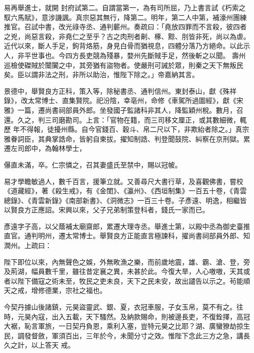 \begin{pinyinscope}
 易再舉進士，就開
 封府試第二。自謂當第一，為有司所屈，乃上書言試《朽索之馭六馬賦》，意涉譏諷。真宗惡其無行，降第二。明年，第二人中第，補濠州團練推官。召試中書，改光祿寺丞、通判蘄州。奏疏曰：「堯放四罪而不言殺，彼四者之兇，尚惡言殺，非堯仁之至乎？古之肉刑者劓、椓、黥、刖皆非死，尚以為虐。近代以來，斷人手足，鉤背烙筋，身見白骨而猶視息，四體分落乃方絕命。以此示人，非平世事也。今四方長吏競為殘暴，婺州先斷賊手足，然後斬之以聞。
 壽州巡檢使磔賊於闤闠之中，其旁猶有盜物者。使嚴刑可誡於眾，則秦之天下無叛民矣。臣以謂非法之刑，非所以助治，惟陛下除之。」帝嘉納其言。



 景德中，舉賢良方正科，策入等，除秘書丞、通判信州。東封泰山，獻《殊祥錄》，改太常博士、直集賢院。祀汾陰，幸亳州，命修《車駕所過圖經》，獻《宋雅》一篇，遷尚書祠部員外郎。坐發國子監諸科非其人，降監穎州稅。數月，召還。久之，判三司磨勘司。上言：「官物在籍，而三司移文厘正，或其數細微，輒歷
 年不得報，徒擾州縣。自今官錢百、穀斗、帛二尺以下，非欺紿者除之。」真宗雅眷詞臣，其典掌誥命，皆躬自柬拔。擢知制誥、判登聞鼓院、糾察在京刑獄。累遷左司郎中，為翰林學士，



 儤直未滿，卒。仁宗憐之，召其妻盛氏至禁中，賜以冠帔。



 易才學瞻敏過人，數千百言，援筆立就。又善尋尺大書行草，及喜觀佛書，嘗校《道藏經》，著《殺生戒》，有《金閨》、《瀛州》、《西垣制集》一百五十卷，《青雲總錄》、《青雲新錄》《南部新書》、《洞微志》一百三十卷。子彥遠、明逸，相繼皆
 以賢良方正應詔。宋興以來，父子兄弟制策登科者，錢氏一家而已。



 彥遠字子高，以父蔭補太廟齋郎，累遷大理寺丞。舉進士第，以殿中丞為御史臺推直官。通判明州，遷太常博士。舉賢良方正能直言極諫科，擢尚書祠部員外郎、知潤州。上疏曰：



 陛下即位以來，內無聲色之娛，外無畋漁之樂，而前歲地震，雄、霸、滄、登，旁及荊湖，幅員數千里，雖往昔定襄之異，未甚於此。今復大旱，人心嗷嗷，天其或
 者以陛下備寇之術未至，牧民之吏未良，天下之民未安，故出譴告以示之。茍能順天之戒，增修德業，宗社之福也。



 今契丹據山後諸鎮，元昊盜靈武、銀、夏，衣冠車服，子女玉帛，莫不有之。往時，元昊內寇，出入五載，天下騷然。及納款賜命，則被邊長吏，不復銓擇，高冠大裾，恥言軍旅，一日契丹負恩，乘利入塞，豈特元昊之比耶？湖、廣蠻獠劫掠生民，調發督斂，軍須百出，三年於今，未聞分寸之效。惟陛下念此三方之急，講長久之計，以上答天
 戒。




\end{pinyinscope}
